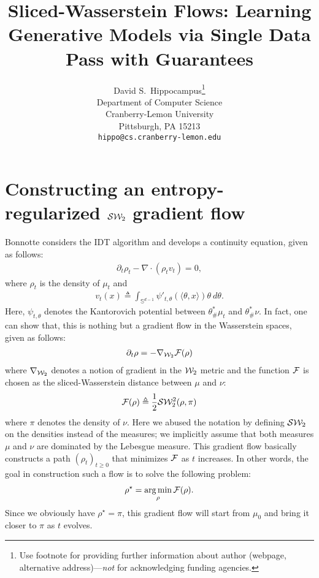\documentclass{article}
\title{Sliced-Wasserstein Flows: Learning Generative Models via Single Data Pass with Guarantees}
\author{
  David S.~Hippocampus\thanks{Use footnote for providing further
    information about author (webpage, alternative
    address)---\emph{not} for acknowledging funding agencies.} \\
  Department of Computer Science\\
  Cranberry-Lemon University\\
  Pittsburgh, PA 15213 \\
  \texttt{hippo@cs.cranberry-lemon.edu} \\
}
\newcommand{\W}{{\cal W}_2}
\newcommand{\F}{{\cal F}}
\newcommand{\SW}{{\cal S}{\cal W}_2}
\DeclareMathOperator*{\argmin}{arg\min}
\begin{document}

\maketitle

\begin{abstract}

\end{abstract}

\section{Constructing an entropy-regularized $\SW$ gradient flow}

Bonnotte \cite{bonnotte2013unidimensional} considers the IDT algorithm \cite{pitie2005n} and develops a continuity equation, given as follows:
\begin{align}
\partial_t \rho_t - \nabla \cdot (\rho_t v_t) = 0,
\end{align}
where $\rho_t$ is the density of $\mu_t$ and
\begin{align}
v_t(x) \triangleq \int_{\mathbb{S}^{d-1}} \psi'_{t,\theta}(\langle \theta, x \rangle) \theta \> d\theta. \label{eqn:idt_v}
\end{align}
Here, $\psi_{t,\theta}$ denotes the Kantorovich potential between $\theta^*_{\#}\mu_t$ and $\theta^*_{\#}\nu$. In fact, one can show that, this is nothing but a gradient flow in the Wasserstein spaces, given as follows:
\begin{align}
\partial_t \rho = - \nabla_{\W} \F(\rho) \label{eqn:gradflow}
\end{align}
where $\nabla_{\W}$ denotes a notion of gradient in the $\W$ metric and the function $\F$ is chosen as the sliced-Wasserstein distance between $\mu$ and $\nu$:
\begin{align}
\F(\rho) \triangleq \frac1{2} \SW^2(\rho, \pi)
\end{align}
where $\pi$ denotes the density of $\nu$. Here we abused the notation by defining $\SW$ on the densities instead of the measures; we implicitly assume that both measures $\mu$ and $\nu$ are dominated by the Lebesgue measure. This gradient flow basically constructs a path $(\rho_t)_{t\geq 0}$ that minimizes $\F$ as $t$ increases. In other words, the goal in construction such a flow is to solve the following problem:
\begin{align}
\rho^\star = \argmin_\rho \F(\rho).
\end{align}
Since we obviously have $\rho^\star = \pi$, this gradient flow will start from $\mu_0$ and bring it closer to $\pi$ as $t$ evolves.
\end{document}
